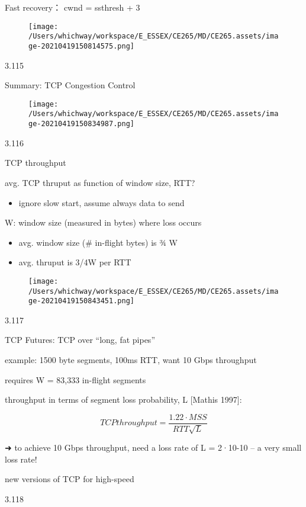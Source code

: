\documentclass[
]{article}
\begin{document}
Fast recovery： cwnd = ssthresh + 3

\begin{figure}
\centering
\texttt{[image: /Users/whichway/workspace/E\_ESSEX/CE265/MD/CE265.assets/image-20210419150814575.png]}
\caption{}
\end{figure}

3.115

Summary: TCP Congestion Control

\begin{figure}
\centering
\texttt{[image: /Users/whichway/workspace/E\_ESSEX/CE265/MD/CE265.assets/image-20210419150834987.png]}
\caption{}
\end{figure}

3.116

TCP throughput

avg. TCP thruput as function of window size, RTT?

\begin{itemize}
\item
  ignore slow start, assume always data to send
\end{itemize}

W: window size (measured in bytes) where loss occurs

\begin{itemize}
\item
  avg. window size (\# in-flight bytes) is ¾ W
\item
  avg. thruput is 3/4W per RTT
\end{itemize}

\begin{figure}
\centering
\texttt{[image: /Users/whichway/workspace/E\_ESSEX/CE265/MD/CE265.assets/image-20210419150843451.png]}
\caption{}
\end{figure}

3.117

TCP Futures: TCP over ``long, fat pipes''

example: 1500 byte segments, 100ms RTT, want 10 Gbps throughput

requires W = 83,333 in-flight segments

throughput in terms of segment loss probability, L {[}Mathis 1997{]}:

\[TCP throughput = \frac{1.22·MSS}{RTT \sqrt{L}}\]

➜ to achieve 10 Gbps throughput, need a loss rate of L = 2·10-10 -- a
very small loss rate!

new versions of TCP for high-speed

3.118
\end{document}
